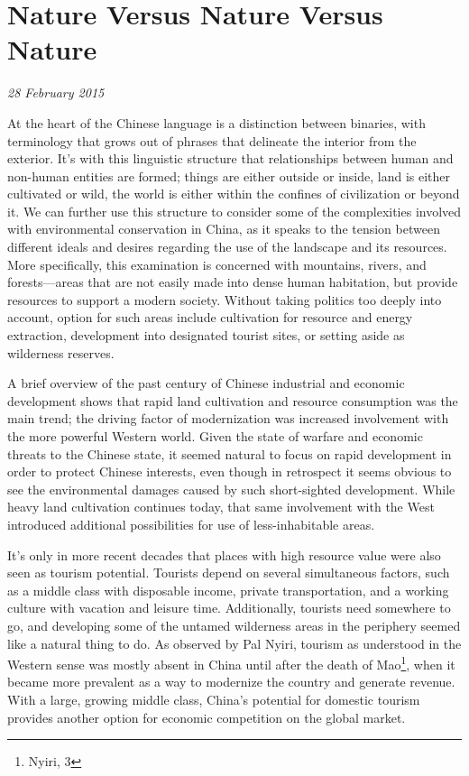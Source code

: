 \section{Nature Versus Nature Versus Nature}

\textit{28 February 2015}

At the heart of the Chinese language is a distinction between binaries, with
terminology that grows out of phrases that delineate the interior from the
exterior. It's with this linguistic structure that relationships between human
and non-human entities are formed; things are either outside or inside, land is
either cultivated or wild, the world is either within the confines of
civilization or beyond it. We can further use this structure to consider some of
the complexities involved with environmental conservation in China, as it speaks
to the tension between different ideals and desires regarding the use of the
landscape and its resources. More specifically, this examination is concerned
with mountains, rivers, and forests---areas that are not easily made into dense
human habitation, but provide resources to support a modern society. Without
taking politics too deeply into account, option for such areas include
cultivation for resource and energy extraction, development into designated
tourist sites, or setting aside as wilderness reserves.

A brief overview of the past century of Chinese industrial and economic
development shows that rapid land cultivation and resource consumption was the
main trend; the driving factor of modernization was increased involvement with
the more powerful Western world. Given the state of warfare and economic threats
to the Chinese state, it seemed natural to focus on rapid development in order
to protect Chinese interests, even though in retrospect it seems obvious to see
the environmental damages caused by such short-sighted development. While heavy
land cultivation continues today, that same involvement with the West introduced
additional possibilities for use of less-inhabitable areas.

It's only in more recent decades that places with high resource value were also
seen as tourism potential. Tourists depend on several simultaneous factors, such
as a middle class with disposable income, private transportation, and a working
culture with vacation and leisure time. Additionally, tourists need somewhere to
go, and developing some of the untamed wilderness areas in the periphery seemed
like a natural thing to do. As observed by Pal Nyiri, tourism as understood in
the Western sense was mostly absent in China until after the death of
Mao\footnote{Nyiri, 3}, when it became more prevalent as a way to modernize the
country and generate revenue. With a large, growing middle class, China's
potential for domestic tourism provides another option for economic competition
on the global market.

